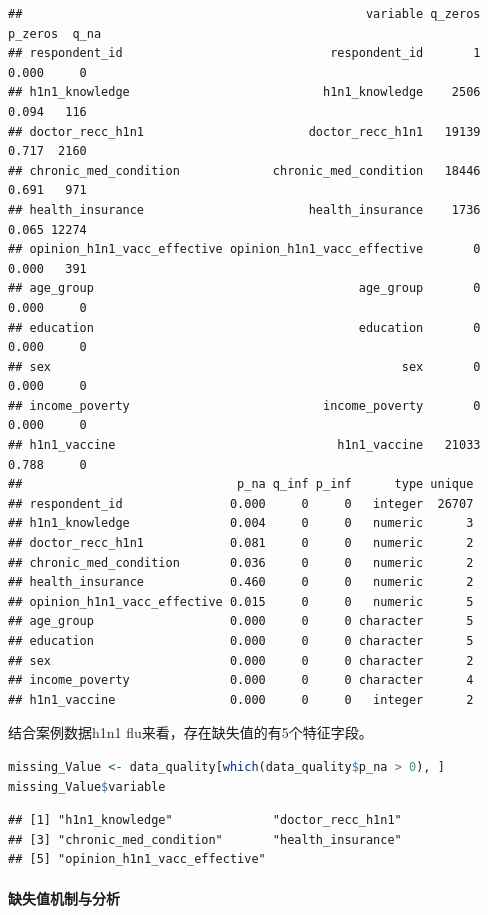 \documentclass[]{ctexbook}
\let\oldparagraph\paragraph
\renewcommand{\paragraph}[1]{\oldparagraph{#1}\mbox{}}
\begin{document}
\begin{lstlisting}
##                                                variable q_zeros p_zeros  q_na
## respondent_id                             respondent_id       1   0.000     0
## h1n1_knowledge                           h1n1_knowledge    2506   0.094   116
## doctor_recc_h1n1                       doctor_recc_h1n1   19139   0.717  2160
## chronic_med_condition             chronic_med_condition   18446   0.691   971
## health_insurance                       health_insurance    1736   0.065 12274
## opinion_h1n1_vacc_effective opinion_h1n1_vacc_effective       0   0.000   391
## age_group                                     age_group       0   0.000     0
## education                                     education       0   0.000     0
## sex                                                 sex       0   0.000     0
## income_poverty                           income_poverty       0   0.000     0
## h1n1_vaccine                               h1n1_vaccine   21033   0.788     0
##                              p_na q_inf p_inf      type unique
## respondent_id               0.000     0     0   integer  26707
## h1n1_knowledge              0.004     0     0   numeric      3
## doctor_recc_h1n1            0.081     0     0   numeric      2
## chronic_med_condition       0.036     0     0   numeric      2
## health_insurance            0.460     0     0   numeric      2
## opinion_h1n1_vacc_effective 0.015     0     0   numeric      5
## age_group                   0.000     0     0 character      5
## education                   0.000     0     0 character      5
## sex                         0.000     0     0 character      2
## income_poverty              0.000     0     0 character      4
## h1n1_vaccine                0.000     0     0   integer      2
\end{lstlisting}

结合案例数据h1n1 flu来看，存在缺失值的有5个特征字段。

\begin{lstlisting}[language=R]
missing_Value <- data_quality[which(data_quality$p_na > 0), ]
missing_Value$variable
\end{lstlisting}

\begin{lstlisting}
## [1] "h1n1_knowledge"              "doctor_recc_h1n1"           
## [3] "chronic_med_condition"       "health_insurance"           
## [5] "opinion_h1n1_vacc_effective"
\end{lstlisting}

\hypertarget{ux7f3aux5931ux503cux673aux5236ux4e0eux5206ux6790}{%
\paragraph{缺失值机制与分析}\label{ux7f3aux5931ux503cux673aux5236ux4e0eux5206ux6790}}
\end{document}
